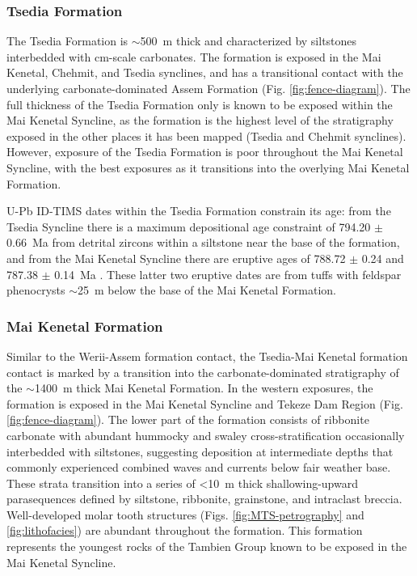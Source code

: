 \subsubsection{Tsedia Formation}

The Tsedia Formation is $\sim$500~m thick and characterized by siltstones interbedded with cm-scale carbonates. The formation is exposed in the Mai Kenetal, Chehmit, and Tsedia synclines, and has a transitional contact with the underlying carbonate-dominated Assem Formation (Fig. \ref{fig:fence-diagram}). The full thickness of the Tsedia Formation only is known to be exposed within the Mai Kenetal Syncline, as the formation is the highest level of the stratigraphy exposed in the other places it has been mapped (Tsedia and Chehmit synclines). However, exposure of the Tsedia Formation is poor throughout the Mai Kenetal Syncline, with the best exposures as it transitions into the overlying Mai Kenetal Formation.

U-Pb ID-TIMS dates within the Tsedia Formation constrain its age: from the Tsedia Syncline there is a maximum depositional age constraint of 794.20 $\pm$ 0.66~Ma from detrital zircons within a siltstone near the base of the formation, and from the Mai Kenetal Syncline there are eruptive ages of 788.72 $\pm$ 0.24 and 787.38 $\pm$ 0.14~Ma \citep{Swanson-Hysell2015a}. These latter two eruptive dates are from tuffs with feldspar phenocrysts $\sim$25~m below the base of the Mai Kenetal Formation.

\subsubsection{Mai Kenetal Formation}

Similar to the Werii-Assem formation contact, the Tsedia-Mai Kenetal formation contact is marked by a transition into the carbonate-dominated stratigraphy of the $\sim$1400~m thick Mai Kenetal Formation. In the western exposures, the formation is exposed in the Mai Kenetal Syncline and Tekeze Dam Region (Fig. \ref{fig:fence-diagram}). The lower part of the formation consists of ribbonite carbonate with abundant hummocky and swaley cross-stratification occasionally interbedded with siltstones, suggesting deposition at intermediate depths that commonly experienced combined waves and currents below fair weather base. These strata transition into a series of \textless10~m thick shallowing-upward parasequences defined by siltstone, ribbonite, grainstone, and intraclast breccia. Well-developed molar tooth structures (Figs. \ref{fig:MTS-petrography} and \ref{fig:lithofacies}) are abundant throughout the formation. This formation represents the youngest rocks of the Tambien Group known to be exposed in the Mai Kenetal Syncline.


